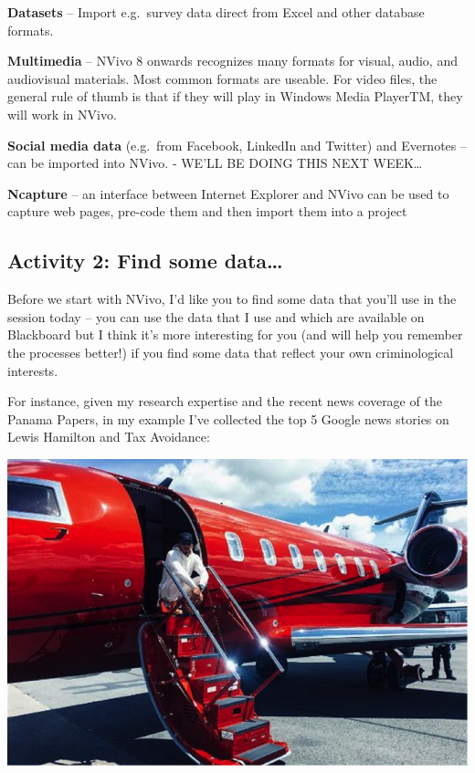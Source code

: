 \documentclass[]{book}
\theoremstyle{definition}
\theoremstyle{definition}
\theoremstyle{definition}
\theoremstyle{remark}
\begin{document}
\textbf{Datasets} -- Import e.g.~survey data direct from Excel and other
database formats.

\textbf{Multimedia} -- NVivo 8 onwards recognizes many formats for
visual, audio, and audiovisual materials. Most common formats are
useable. For video files, the general rule of thumb is that if they will
play in Windows Media PlayerTM, they will work in NVivo.

\textbf{Social media data} (e.g.~from Facebook, LinkedIn and Twitter)
and Evernotes -- can be imported into NVivo. - WE'LL BE DOING THIS NEXT
WEEK\ldots{}

\textbf{Ncapture} -- an interface between Internet Explorer and NVivo
can be used to capture web pages, pre-code them and then import them
into a project

\hypertarget{activity-2-find-some-data}{%
\subsection{Activity 2: Find some
data\ldots{}}\label{activity-2-find-some-data}}

Before we start with NVivo, I'd like you to find some data that you'll
use in the session today -- you can use the data that I use and which
are available on Blackboard but I think it's more interesting for you
(and will help you remember the processes better!) if you find some data
that reflect your own criminological interests.

For instance, given my research expertise and the recent news coverage
of the Panama Papers, in my example I've collected the top 5 Google news
stories on Lewis Hamilton and Tax Avoidance:

\includegraphics{imgs/qual_02.png}
\end{document}
